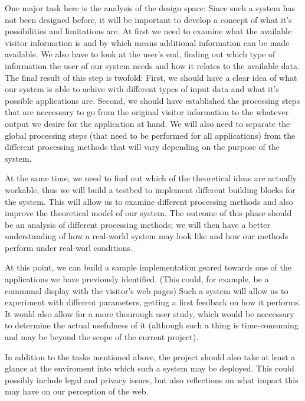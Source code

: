 \documentclass[a4paper]{danarticle}
\begin{document}
    One major task here is the analysis of the design space: Since such 
    a system has not been designed before, it will be important to 
    develop a concept of what it's possibilities and limitations are.
    At first we need to examine what the available visitor information 
    is and by which means additional information can be made available.
    We also have to look at the user's end, finding out which type of 
    information the user of our system needs and how it relates to the
    available data. The final result of this step is twofold: First, we
    should have a clear idea of what our system is able to achive with
    different types of input data and what it's possible applications are.
    Second, we should have established the processing steps that are
    neccessary to go from the original visitor information to the whatever
    output we desire for the application at hand. We will also need to 
    separate the global processing steps (that need to be performed
    for all applications) from the different processing methods that will
    vary depending on the purpose of the system.
    
    At the same time, we need to find out which of the theoretical ideas
    are actually workable, thus we will build a testbed to implement 
    different building blocks for the system. This will allow us to 
    examine different processing methods and also improve the theoretical
    model of our system. The outcome of this phase should be an analysis
    of different processing methods; we will then have a better
    understanding of how a real-world system may look like and how our
    methods perform under real-worl conditions.
    
    At this point, we can build a sample implementation geared towards 
    one of the applications we have previously identified. (This could,
    for example, be a communal display with the visitor's web pages)
    Such a system will allow us to experiment with different parameters,
    getting a first feedback on how it performs. It would also allow for
    a more thourough user study, which would be neccessary to determine
    the actual usefulness of it (although such a thing is time-consuming
    and may be beyond the scope of the current project).
    
    In addition to the tasks mentioned above, the project should also take
    at least a glance at the enviroment into which such a system may be
    deployed. This could possibly include legal and privacy issues, but 
    also reflections on what impact this may have on our perception of 
    the web.
\end{document}
